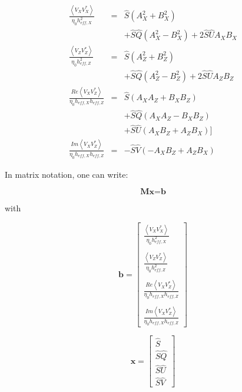 \documentclass[a4paper,14pt]{extbook}
\begin{document}
\begin{eqnarray}
\frac{\left\langle V_X V_X^{*} \right\rangle }{\eta_0 h_{eff,X}^2}&=& \hat{S}(A^2_X+ B^2_X) \\
&&+\hat{S}\hat{Q}(A^2_X- B^2_X)+ 2 \hat{S}\hat{U}A_X B_X   \nonumber \\
\frac{\left\langle V_Z V_Z^{*} \right\rangle }{\eta_0 h_{eff,Z}^2}&=& \hat{S}(A^2_Z + B^2_Z) \\
&&+\hat{S}\hat{Q}(A^2_Z - B^2_Z)+ 2 \hat{S}\hat{U}A_Z B_Z   \nonumber \\
\frac{Re \left\langle V_X V_Z^{*}\right\rangle }{\eta_0 h_{eff,X} h_{eff,Z}}&=& \hat{S}(A_X A_Z +  B_X B_Z) \\
&&+ \hat{S}\hat{Q}(A_X A_Z -B_X B_Z)  \nonumber\\
&&+ \hat{S}\hat{U} (A_X B_Z + A_Z B_X)] \nonumber \\
\frac{Im \left\langle V_X V_Z^{*}\right\rangle }{\eta_0 h_{eff,X} h_{eff,Z}}&=& -\hat{S} \hat{V}(-A_X B_Z + A_Z B_X )
\end{eqnarray}

In matrix notation, one can write:

\begin{equation}\label{lineare_gleichung}
\textbf{M}\textbf{x}=\textbf{b}
\end{equation}


with

\begin{equation}
\textbf{b}=\left[ \begin{array}{c}
\frac{\left\langle V_X V_X^{*} \right\rangle }{\eta_0 h_{eff,X}^2} \\ \\
 \frac{\left\langle V_Z V_Z^{*} \right\rangle }{\eta_0 h_{eff,Z}^2}\\ \\
\frac{Re \left\langle V_X V_Z^{*}\right\rangle }{\eta_0 h_{eff,X} h_{eff,Z}} \\ \\
\frac{Im \left\langle V_X V_Z^{*}\right\rangle }{\eta_0 h_{eff,X} h_{eff,Z}}
\end{array}  \right]
\end{equation}

\begin{equation}
\textbf{x}=\left[ \begin{array}{c}
\hat{S}\\
\hat{S}\hat{Q}\\
\hat{S}\hat{U}\\
\hat{S}\hat{V}
\end{array}  \right]
\end{equation}
\end{document}
